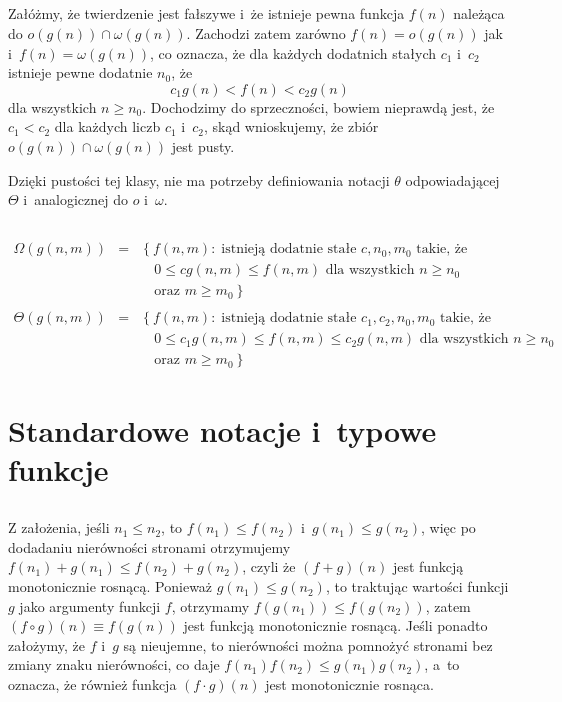 \subsection{} %
Załóżmy, że twierdzenie jest fałszywe i~że istnieje pewna funkcja $f(n)$ należąca do $o(g(n))\cap\omega(g(n))$. Zachodzi zatem zarówno $f(n)=o(g(n))$ jak i~$f(n)=\omega(g(n))$, co oznacza, że dla każdych dodatnich stałych $c_1$ i~$c_2$ istnieje pewne dodatnie $n_0$, że
\[
	c_1g(n)<f(n)<c_2g(n)
\]
dla wszystkich $n\ge n_0$. Dochodzimy do sprzeczności, bowiem nieprawdą jest, że $c_1<c_2$ dla każdych liczb $c_1$ i~$c_2$, skąd wnioskujemy, że zbiór $o(g(n))\cap\omega(g(n))$ jest pusty.

Dzięki pustości tej klasy, nie ma potrzeby definiowania notacji $\theta$ odpowiadającej $\Theta$ i~analogicznej do $o$ i~$\omega$.

\subsection{} %
\begin{eqnarray*}
	\Omega(g(n,m)) &=& \left\{f(n,m):\;\mbox{istnieją dodatnie stałe }c,n_0,m_0\mbox{ takie, że}\right. \\
	&& \quad 0\le cg(n,m)\le f(n,m)\mbox{ dla wszystkich }n\ge n_0 \\
	&& \left.\quad\mbox{oraz }m\ge m_0\right\} \\\\
	\Theta(g(n,m)) &=& \left\{f(n,m):\;\mbox{istnieją dodatnie stałe }c_1,c_2,n_0,m_0\mbox{ takie, że}\right. \\
	&& \quad 0\le c_1g(n,m)\le f(n,m)\le c_2g(n,m)\mbox{ dla wszystkich }n\ge n_0 \\
	&& \left.\quad\mbox{oraz }m\ge m_0\right\}
\end{eqnarray*}

\section{Standardowe notacje i~typowe funkcje}

\subsection{} %
Z założenia, jeśli $n_1\le n_2$, to $f(n_1)\le f(n_2)$ i~$g(n_1)\le g(n_2)$, więc po dodadaniu nierówności stronami otrzymujemy $f(n_1)+g(n_1)\le f(n_2)+g(n_2)$, czyli że $(f+g)(n)$ jest funkcją monotonicznie rosnącą. Ponieważ $g(n_1)\le g(n_2)$, to traktując wartości funkcji $g$ jako argumenty funkcji $f$, otrzymamy $f(g(n_1))\le f(g(n_2))$, zatem $(f\circ g)(n)\equiv f(g(n))$ jest funkcją monotonicznie rosnącą. Jeśli ponadto założymy, że $f$ i~$g$ są nieujemne, to nierówności można pomnożyć stronami bez zmiany znaku nierówności, co daje $f(n_1)f(n_2)\le g(n_1)g(n_2)$, a~to oznacza, że również funkcja $(f\cdot g)(n)$ jest monotonicznie rosnąca.

